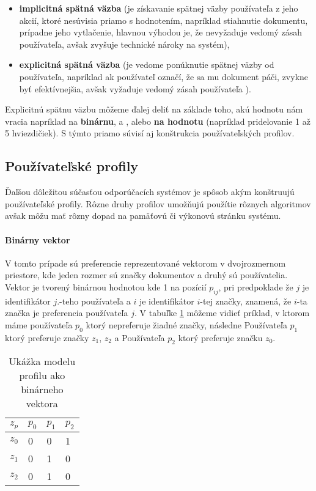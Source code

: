 \begin{itemize}
\item{\textbf{implicitná spätná väzba} (je získavanie spätnej väzby používateľa z jeho akcií,
ktoré nesúvisia priamo s hodnotením, napríklad stiahnutie dokumentu, prípadne jeho vytlačenie, 
hlavnou výhodou je, že nevyžaduje vedomý zásah používateľa, avšak zvyšuje technické nároky na 
systém), }
\item{\textbf{explicitná spätná väzba} (je vedome ponúknutie spätnej väzby od používateľa,
napríklad ak používateľ označí, že sa mu dokument páči, \cite{basic_user_profiles}
zvykne byť efektívnejšia, avšak vyžaduje vedomý zásah používateľa )}.
\end{itemize}

Explicitnú spätnu väzbu môžeme ďalej deliť na základe toho, akú hodnotu nám vracia napríklad 
na \textbf{binárnu},  a , alebo \textbf{na hodnotu} (napríklad
pridelovanie 1 až 5 hviezdičiek). S týmto priamo súvisí aj konštrukcia používateľských profilov.

\subsection{Používateľské profily}

Ďaľšou dôležitou súčasťou odporúčacích systémov je spôsob akým konštruujú používateľské profily.
Rôzne druhy profilov umožňujú použítie rôznych algoritmov avšak môžu mať rôzny dopad na 
pamäťovú či výkonovú stránku systému\cite{basic_user_profiles}.

\paragraph{Binárny vektor}

V tomto prípade sú preferencie reprezentované vektorom v dvojrozmernom priestore, kde
jeden rozmer sú značky dokumentov a druhý sú používatelia. Vektor
je tvorený binárnou hodnotou kde 1 na pozícií \(p_{ij}\), pri predpoklade že \(j\) je 
identifikátor \(j\).-teho používateľa a \(i\) je identifikátor \(i\)-tej značky,
znamená, že \(i\)-ta značka je preferencia používateľa \(j\).
V tabuľke \ref{table:binaryprofile} môžeme vidieť príklad, v ktorom máme používateľa \(p_0\)
ktorý nepreferuje žiadné značky, následne Používateľa \(p_1\) ktorý preferuje značky \(z_1\),
\(z_2\)
a Používateľa \(p_2\) ktorý preferuje značku \(z_0\).

\begin{table}[h]
\begin{center}
\begin{tabular}{|l|l|l|l|}
\hline
\(z_p\)  & \(p_0\) & \(p_1\) & \(p_2\) \\ \hline
\(z_0\) & 0     & 0        & 1        \\ \hline
\(z_1\) & 0     & 1        & 0        \\ \hline
\(z_2\) & 0     & 1        & 0        \\ \hline
\end{tabular}
\end{center}
\caption{Ukážka modelu profilu ako binárneho vektora}
\label{table:binaryprofile}
\end{table}

